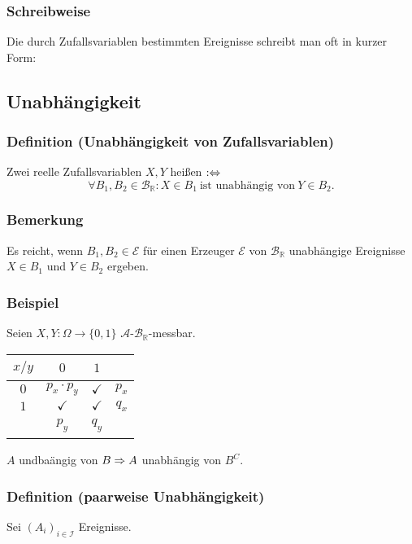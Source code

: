 \subsubsection{Schreibweise}
Die durch Zufallsvariablen bestimmten Ereignisse schreibt man oft in kurzer Form:
\subsection{Unabh\"angigkeit}
\subsubsection{Definition (Unabh\"angigkeit von Zufallsvariablen)}
Zwei reelle Zufallsvariablen $X,Y$ hei\ss{}en  $:\Leftrightarrow$
\[\forall B_1,B_2\in\mathcal{B}_\mathbb{R}\colon X\in B_1\ \text{ist unabh\"angig von}\ Y\in B_2.\]
\subsubsection{Bemerkung}
Es reicht, wenn $B_1,B_2\in\mathcal{E}$ f\"ur einen Erzeuger $\mathcal{E}$ von $\mathcal{B}_\mathbb{R}$ unabh\"angige Ereignisse $X\in B_1$ und $Y\in B_2$ ergeben.
\subsubsection{Beispiel}
Seien $X,Y\colon\Omega\to\{0,1\}$ $\mathcal{A}$-$\mathcal{B}_\mathbb{R}$-messbar.
\begin{center}
\begin{tabular}{c|c|c|c}
$x/y$&$0$&$1$&~\\
\hline
$0$&$p_x\cdot p_y$&$\checkmark$&$p_x$\\
\hline
$1$&$\checkmark$&$\checkmark$&$q_x$\\
\hline
~&$p_y$&$q_y$&~
\end{tabular}
\end{center}
$A$ undba\"angig von $B\Rightarrow A$ unabh\"angig von $B^C$.
\subsubsection{Definition (paarweise Unabh\"angigkeit)}
Sei $(A_i)_{i\in\mathcal{I}}$ Ereignisse.
